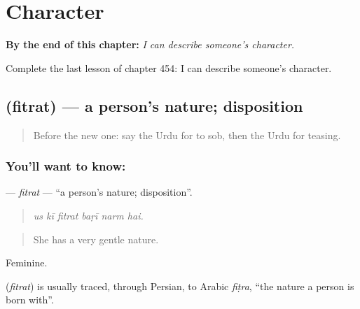 
\chapter{Character}
\label{ch:ur-character}

\begin{chapteropening}
\textbf{By the end of this chapter:} \emph{I can describe someone's character.}

Complete the last lesson of chapter 454: I can describe someone's character.
\end{chapteropening}

\section[\texorpdfstring{\ur{فطرت} (fitrat)}{فطرت (fitrat)}]{ (fitrat) — a person's nature; disposition}

\label{lesson:UR-C454-fitrat}



\begin{quote}
Before the new one: say the Urdu for to sob, then the Urdu for teasing.
\end{quote}

\subsection*{You'll want to know: }
\textbf{} — \emph{fitrat} — \textquotedblleft{}a person's nature; disposition\textquotedblright{}.

\begin{quote}
     
\end{quote}

\begin{quote}
\emph{us kī fitrat baṛī narm hai.}
\end{quote}

\begin{quote}
She has a very gentle nature.
\end{quote}

Feminine.

\begin{cousinweb}
\textbf{} (\emph{fitrat}) is usually traced, through Persian, to Arabic \emph{fiṭra}, \textquotedblleft{}the nature a person is born with\textquotedblright{}.
\end{cousinweb}

